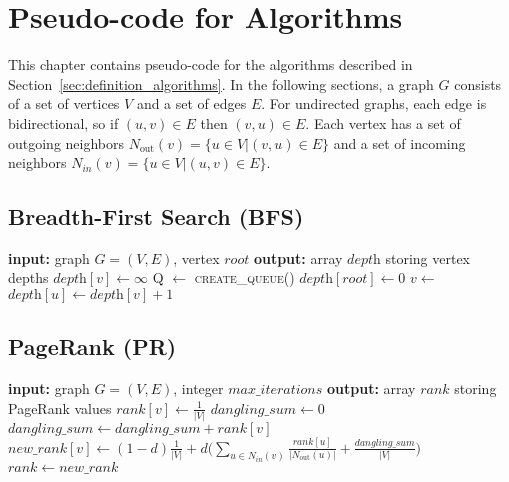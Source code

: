 \chapter{Pseudo-code for Algorithms}
\label{chap:algorithms}
This chapter contains pseudo-code for the algorithms described in Section~\ref{sec:definition_algorithms}. In the following sections, a graph $G$ consists of a set of vertices $V$ and a set of edges $E$. For undirected graphs, each edge is bidirectional, so if $(u, v) \in E$ then $(v, u) \in E$. Each vertex has a set of outgoing neighbors $N_\mathrm{out}(v) = \{u \in V | (v, u) \in E\}$ and a set of incoming neighbors $N_{in}(v) = \{u \in V | (u, v) \in E\}$.

\section{Breadth-First Search (BFS)}

\begin{algorithm}[h!]
\begin{algorithmic}[1]
\Statex \textbf{input:} graph $G=(V,E)$, vertex $\textit{root}$
\Statex \textbf{output:} array $\textit{depth}$ storing vertex depths
  \State $\textit{depth}[v] \gets \infty$
\EndFor
\State Q $\gets$  \textsc{create\_queue()}
\State {}
\State $\textit{depth}[\textit{root}] \gets 0$
  \State $v \gets $ 
      \State $\textit{depth}[u] \gets \textit{depth}[v] + 1$
      \State {}
    \EndIf
  \EndFor
\EndWhile
\end{algorithmic}
\end{algorithm}

\section{PageRank (PR)}

\begin{algorithm}[h!]
\begin{algorithmic}[1]
\Statex \textbf{input:} graph $G=(V,E)$, integer $\textit{max\_iterations}$
\Statex \textbf{output:} array $\textit{rank}$ storing PageRank values
  \State $\textit{rank}[v] \gets \frac{1}{|V|}$
\EndFor
{}
\State $\textit{dangling\_sum} \gets 0$
    \State $\textit{dangling\_sum} \gets \textit{dangling\_sum} + \textit{rank}[v]$
  \EndIf
\EndFor
{}
  \State $\textit{new\_rank}[v] \gets (1-d)\frac{1}{|V|} + d \Big( \sum_{u \in N_{in}(v)} \frac{\textit{rank}[u]}{|N_\mathrm{out}(u)|} +  \frac{\textit{dangling\_sum}}{|V|} \Big)$
\EndFor
\State $\textit{rank} \gets new\_rank$
\EndFor
\end{algorithmic}
\end{algorithm}

